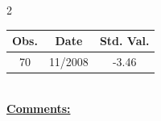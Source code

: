 
\bigskip 
\begin{multicols}{2}{ 
\begin{tabular}{ccc}
\hline  Obs.  &  Date &  Std. Val. \\ 
\hline 
                       70 &       11/2008 &         -3.46 \vspace{-.12in} \\  
 \end{tabular} 
\\ 
 \columnbreak 
 \singlespacing 
 \underline{\textbf{Comments:}} \\ 
 \bigskip       

 } 
\end{multicols} 
